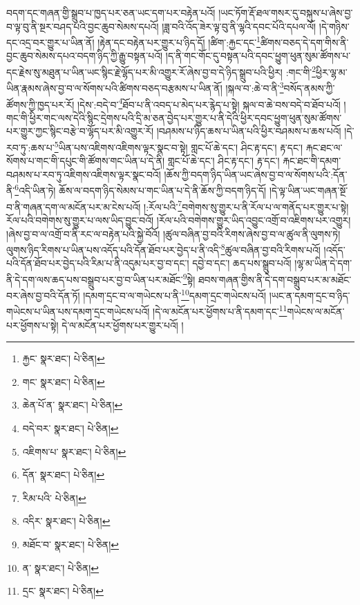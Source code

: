 བདག་དང་གཞན་གྱི་སྒྲུབ་པ་ཁྱད་པར་ཅན་ཡང་དག་པར་བརྟེན་པའོ། །ཡང་ཏོག་རྡོ་ཐལ་གསར་དུ་བསྐུས་པ་ཞེས་བྱ་བ་ལྟ་བུ་ནི་སྔར་བཤད་པའི་བྱང་ཆུབ་སེམས་དཔའོ། །ཟླ་བའི་འོད་ཟེར་ལྟ་བུ་ནི་ལྷའི་དབང་པོའི་དཔལ་ལོ། །དེ་གཉིས་དང་འདྲ་བར་གྱུར་པ་ཡིན་ནོ། །རྟེན་དང་བརྟེན་པར་གྱུར་པ་ཉིད་དོ། །ཚིག་:རྐྱང་དང་\footnote{རྐྱང་  སྣར་ཐང་།  པེ་ཅིན། }ཚིགས་བཅད་དེ་དག་གིས་ནི་བྱང་ཆུབ་སེམས་དཔའ་བདག་ཉིད་ཀྱི་རྒྱུ་བསྟན་པའོ། །ད་ནི་གང་གོང་དུ་བསྟན་པའི་དབང་ཕྱུག་ཕུན་སུམ་ཚོགས་པ་དང་རྗེས་སུ་མཐུན་པ་ཡིན་ཡང་སྙིང་རྗེ་ལྷོད་པར་མི་འགྱུར་རོ་ཞེས་བྱ་བ་དེ་ཉིད་སྒྲུབ་པའི་ཕྱིར། :གང་གི་\footnote{གང་  སྣར་ཐང་།  པེ་ཅིན། }ཕྱིར་ལྷ་མ་ཡིན་རྣམས་ཞེས་བྱ་བ་ལ་སོགས་པའི་ཚིགས་བཅད་བརྩམས་པ་ཡིན་ནོ། །སྐལ་བ་:ཆེ་བ་ནི་\footnote{ཆེན་པོ་ན་  སྣར་ཐང་།  པེ་ཅིན། }བསོད་ནམས་ཀྱི་ཚོགས་ཀྱི་ཁྱད་པར་རོ། །དེས་:བདེ་བ་\footnote{བདེ་བར་  སྣར་ཐང་།  པེ་ཅིན། }ཐོབ་པ་ནི་འབད་པ་མེད་པར་རྙེད་པ་སྟེ། སྐལ་བ་ཆེ་བས་བདེ་བ་ཐོབ་པའོ། །གང་གི་ཕྱིར་གང་ལས་དེའི་སྙིང་དྲེགས་པའི་དྲི་མ་ཅན་བྱེད་པར་གྱུར་པ་ནི་དེའི་ཕྱིར་དབང་ཕྱུག་ཕུན་སུམ་ཚོགས་པར་གྱུར་ཀྱང་སྙིང་བརྩེ་བ་ལྷོད་པར་མི་འགྱུར་རོ། །བཤམས་པ་ཉིད་ཆས་པ་ཡིན་པའི་ཕྱིར་བཤམས་པ་ཆས་པའོ། །དེ་རབ་ཏུ་:ཆས་པ་\footnote{འཇིགས་པ་  སྣར་ཐང་།  པེ་ཅིན། }ཡིན་པས་འཇིགས་འཇིགས་ལྟར་སྣང་བ་སྟེ། གླང་པོ་ཆེ་དང་། ཤིང་རྟ་དང་། རྟ་དང་། རྐང་ཐང་ལ་སོགས་པ་གང་གི་དཔུང་གི་ཚོགས་གང་ཡིན་པ་དེ་ནི། གླང་པོ་ཆེ་དང་། ཤིང་རྟ་དང་། རྟ་དང་། རྐང་ཐང་གི་དམག་བཤམས་པ་རབ་ཏུ་འཇིགས་འཇིགས་ལྟར་སྣང་བའོ། །ཆོས་ཀྱི་བདག་ཉིད་ཡིན་ཡང་ཞེས་བྱ་བ་ལ་སོགས་པའི་:དོན་ནི་\footnote{དོན་  སྣར་ཐང་།  པེ་ཅིན། }འདི་ཡིན་ཏེ། ཆོས་ལ་བདག་ཉིད་སེམས་པ་གང་ཡིན་པ་དེ་ནི་ཆོས་ཀྱི་བདག་ཉིད་དོ། །དེ་ལྟ་ཡིན་ཡང་གཞན་སྔོ་བ་ནི་གཞན་དག་ལ་མངོན་པར་མ་ངེས་པའོ། །:རོལ་པའི་\footnote{རིམ་པའི་  པེ་ཅིན། }བགེགས་སུ་གྱུར་པ་ནི་རོལ་པ་ལ་གནོད་པར་གྱུར་པ་སྟེ། རོལ་པའི་བགེགས་སུ་གྱུར་པ་ལས་ཡིད་བྱུང་བའོ། །རོལ་པའི་བགེགས་གྱུར་ཡིད་འབྱུང་འགྲོ་བ་འཇིགས་པར་འགྱུར། །ཞེས་བྱ་བ་ལ་འགྲོ་བ་ནི་རང་ལ་བརྟེན་པའི་སྐྱེ་བོའོ། །ཚུལ་བཞིན་བྱ་བའི་རིགས་ཞེས་བྱ་བ་ལ་ཚུལ་ནི་ལུགས་ཏེ། ལུགས་ཉིད་རིགས་པ་ཡིན་པས་འདོད་པའི་དོན་ཐོབ་པར་བྱེད་པ་ནི་འདི་\footnote{འདིར་  སྣར་ཐང་།  པེ་ཅིན། }ཚུལ་བཞིན་བྱ་བའི་རིགས་པའོ། །འདོད་པའི་དོན་ཐོབ་པར་བྱེད་པའི་རིམ་པ་ནི་འདུམ་པར་བྱ་བ་དང་། དབྱེ་བ་དང་། ཆད་པས་སྒྲུབ་པའོ། །ལྷ་མ་ཡིན་དེ་དག་ནི་དེ་དག་ལས་ཆད་པས་བསྒྲུབ་པར་བྱ་བ་ཡིན་པར་མཐོང་\footnote{མཐོང་བ་  སྣར་ཐང་།  པེ་ཅིན། }སྟེ། ཐབས་གཞན་གྱིས་ནི་དེ་དག་བསྒྲུབ་པར་མ་མཐོང་བར་ཞེས་བྱ་བའི་དོན་ཏོ། །དམག་དྲང་བ་ལ་གཡེངས་པ་ནི་\footnote{ན་  སྣར་ཐང་།  པེ་ཅིན། }དམག་དྲང་གཡེངས་པའོ། །ཡང་ན་དམག་དྲང་བ་ཉིད་གཡེངས་པ་ཡིན་པས་དམག་དྲང་གཡེངས་པའོ། །དེ་ལ་མངོན་པར་ཕྱོགས་པ་ནི་དམག་དང་\footnote{དྲང་  སྣར་ཐང་།  པེ་ཅིན། }གཡེངས་ལ་མངོན་པར་ཕྱོགས་པ་སྟེ། དེ་ལ་མངོན་པར་ཕྱོགས་པར་གྱུར་པའོ། །
